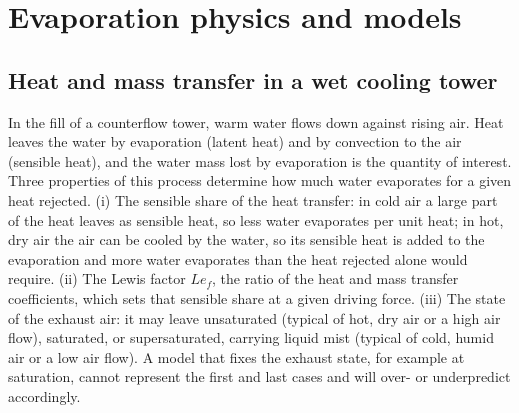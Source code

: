 \documentclass[preprint,12pt]{elsarticle}
\begin{document}
\section{Evaporation physics and models}\label{sec:physics}
\subsection{Heat and mass transfer in a wet cooling tower}
In the fill of a counterflow tower, warm water flows down against rising air. Heat leaves the water by evaporation
(latent heat) and by convection to the air (sensible heat), and the water mass lost by evaporation is the quantity of
interest. Three properties of this process determine how much water evaporates for a given heat rejected. (i) The
sensible share of the heat transfer: in cold air a large part of the heat leaves as sensible heat, so less water
evaporates per unit heat; in hot, dry air the air can be cooled by the water, so its sensible heat is added to the
evaporation and more water evaporates than the heat rejected alone would require. (ii) The Lewis factor $Le_f$, the
ratio of the heat and mass transfer coefficients, which sets that sensible share at a given driving force. (iii) The
state of the exhaust air: it may leave unsaturated (typical of hot, dry air or a high air flow), saturated, or
supersaturated, carrying liquid mist (typical of cold, humid air or a low air flow). A model that fixes the exhaust
state, for example at saturation, cannot represent the first and last cases and will over- or underpredict accordingly.
\end{document}
